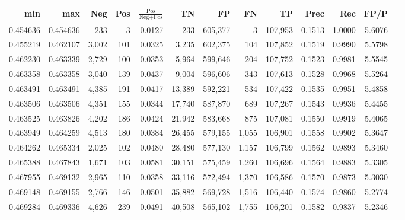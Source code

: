\begin{tabular}{rrrrrrrrrrrrr}
\toprule
     min &      max &   Neg &   Pos & $\frac{\text{Pos}}{\text{Neg}+\text{Pos}}$ &      TN &      FP &      FN &      TP &   Prec &    Rec &   FP/P \\
\midrule
0.454636 & 0.454636 &   233 &     3 &                                     0.0127 &     233 & 605,377 &       3 & 107,953 & 0.1513 & 1.0000 & 5.6076 \\
0.455219 & 0.462107 & 3,002 &   101 &                                     0.0325 &   3,235 & 602,375 &     104 & 107,852 & 0.1519 & 0.9990 & 5.5798 \\
0.462230 & 0.463339 & 2,729 &   100 &                                     0.0353 &   5,964 & 599,646 &     204 & 107,752 & 0.1523 & 0.9981 & 5.5545 \\
0.463358 & 0.463358 & 3,040 &   139 &                                     0.0437 &   9,004 & 596,606 &     343 & 107,613 & 0.1528 & 0.9968 & 5.5264 \\
0.463491 & 0.463491 & 4,385 &   191 &                                     0.0417 &  13,389 & 592,221 &     534 & 107,422 & 0.1535 & 0.9951 & 5.4858 \\
0.463506 & 0.463506 & 4,351 &   155 &                                     0.0344 &  17,740 & 587,870 &     689 & 107,267 & 0.1543 & 0.9936 & 5.4455 \\
0.463525 & 0.463826 & 4,202 &   186 &                                     0.0424 &  21,942 & 583,668 &     875 & 107,081 & 0.1550 & 0.9919 & 5.4065 \\
0.463949 & 0.464259 & 4,513 &   180 &                                     0.0384 &  26,455 & 579,155 &   1,055 & 106,901 & 0.1558 & 0.9902 & 5.3647 \\
0.464262 & 0.465334 & 2,025 &   102 &                                     0.0480 &  28,480 & 577,130 &   1,157 & 106,799 & 0.1562 & 0.9893 & 5.3460 \\
0.465388 & 0.467843 & 1,671 &   103 &                                     0.0581 &  30,151 & 575,459 &   1,260 & 106,696 & 0.1564 & 0.9883 & 5.3305 \\
0.467955 & 0.469132 & 2,965 &   110 &                                     0.0358 &  33,116 & 572,494 &   1,370 & 106,586 & 0.1570 & 0.9873 & 5.3030 \\
0.469148 & 0.469155 & 2,766 &   146 &                                     0.0501 &  35,882 & 569,728 &   1,516 & 106,440 & 0.1574 & 0.9860 & 5.2774 \\
0.469284 & 0.469336 & 4,626 &   239 &                                     0.0491 &  40,508 & 565,102 &   1,755 & 106,201 & 0.1582 & 0.9837 & 5.2346 \\

\end{tabular}
